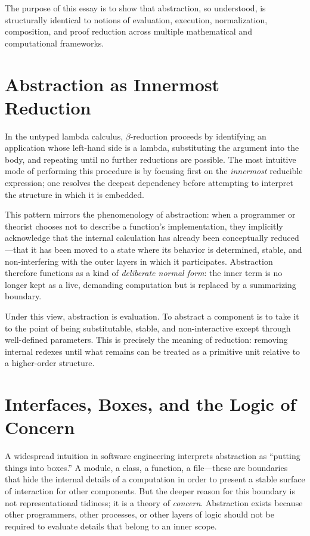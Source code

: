 \documentclass[11pt,letterpaper]{article}
\begin{document}
The purpose of this essay is to show that abstraction, so understood, is structurally identical to notions of evaluation, execution, normalization, composition, and proof reduction across multiple mathematical and computational frameworks.

\section{Abstraction as Innermost Reduction}

In the untyped lambda calculus, $\beta$-reduction proceeds by identifying an application whose left-hand side is a lambda, substituting the argument into the body, and repeating until no further reductions are possible. The most intuitive mode of performing this procedure is by focusing first on the \emph{innermost} reducible expression; one resolves the deepest dependency before attempting to interpret the structure in which it is embedded. 

This pattern mirrors the phenomenology of abstraction: when a programmer or theorist chooses not to describe a function's implementation, they implicitly acknowledge that the internal calculation has already been conceptually reduced---that it has been moved to a state where its behavior is determined, stable, and non-interfering with the outer layers in which it participates. Abstraction therefore functions as a kind of \emph{deliberate normal form}: the inner term is no longer kept as a live, demanding computation but is replaced by a summarizing boundary.

Under this view, abstraction is evaluation. To abstract a component is to take it to the point of being substitutable, stable, and non-interactive except through well-defined parameters. This is precisely the meaning of reduction: removing internal redexes until what remains can be treated as a primitive unit relative to a higher-order structure.

\section{Interfaces, Boxes, and the Logic of Concern}

A widespread intuition in software engineering interprets abstraction as ``putting things into boxes.'' A module, a class, a function, a file---these are boundaries that hide the internal details of a computation in order to present a stable surface of interaction for other components. But the deeper reason for this boundary is not representational tidiness; it is a theory of \emph{concern}. Abstraction exists because other programmers, other processes, or other layers of logic should not be required to evaluate details that belong to an inner scope.
\end{document}
